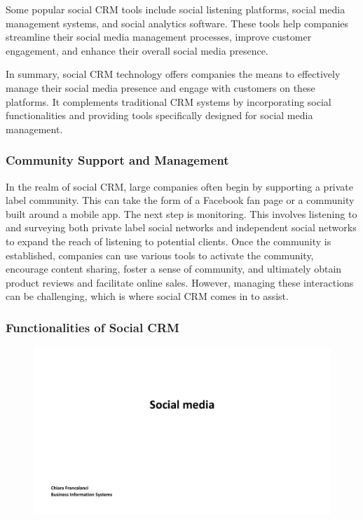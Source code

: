 Some popular social CRM tools include social listening platforms, social
media management systems, and social analytics software. These tools
help companies streamline their social media management processes,
improve customer engagement, and enhance their overall social media
presence.

In summary, social CRM technology offers companies the means to
effectively manage their social media presence and engage with customers
on these platforms. It complements traditional CRM systems by
incorporating social functionalities and providing tools specifically
designed for social media management.

\subsubsection{Community Support and
  Management}\label{community-support-and-management}

In the realm of social CRM, large companies often begin by supporting a
private label community. This can take the form of a Facebook fan page
or a community built around a mobile app. The next step is monitoring.
This involves listening to and surveying both private label social
networks and independent social networks to expand the reach of
listening to potential clients. Once the community is established,
companies can use various tools to activate the community, encourage
content sharing, foster a sense of community, and ultimately obtain
product reviews and facilitate online sales. However, managing these
interactions can be challenging, which is where social CRM comes in to
assist.

\subsubsection{Functionalities of Social
  CRM}\label{functionalities-of-social-crm}

\begin{figure}[!h]
  \centering
  \includegraphics[page=25, trim = 0cm 3.5cm 5cm 0.5cm, clip, width=\imagewidth]{images/04 - Social_Media.pdf}
\end{figure}

